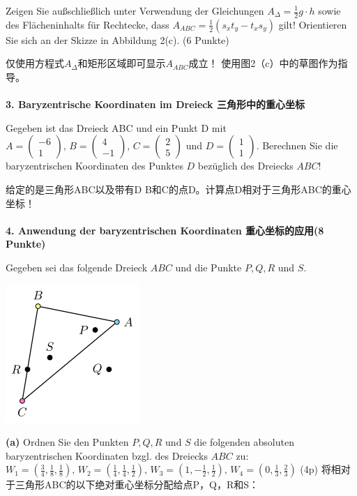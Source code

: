 \documentclass[fleqn]{article}
\begin{document}
Zeigen Sie außschließlich unter Verwendung der Gleichungen $A_\Delta=\frac{1}{2}g\cdot h$ sowie des Flächeninhalts für Rechtecke, dass $A_{ABC}=\frac{1}{2}(s_xt_y-t_xs_y)$ gilt!
Orientieren Sie sich an der Skizze in Abbildung 2(c). (6 Punkte)

仅使用方程式$A_\Delta$和矩形区域即可显示$A_{ABC}$成立！ 使用图2（c）中的草图作为指导。
\\
\\
\noindent\textbf{3. Baryzentrische Koordinaten im Dreieck 三角形中的重心坐标}

Gegeben ist das Dreieck ABC und ein Punkt D mit $A=\begin{pmatrix}
    -6\\1
\end{pmatrix},\,B=\begin{pmatrix}
    4\\-1
\end{pmatrix},\,C=\begin{pmatrix}
    2\\5
\end{pmatrix}$ und $D=\begin{pmatrix}
    1\\1
\end{pmatrix}$. Berechnen Sie die baryzentrischen Koordinaten des Punktes $D$ bezüglich des Dreiecks $ABC$!

给定的是三角形ABC以及带有D B和C的点D。计算点D相对于三角形ABC的重心坐标！
\\
\\
\noindent\textbf{4. Anwendung der baryzentrischen Koordinaten 重心坐标的应用(8 Punkte)}

Gegeben sei das folgende Dreieck $ABC$ und die Punkte $P, Q, R$ und $S$.

\includegraphics[scale=0.6]{17.png}

\indent\textbf{(a)} Ordnen Sie den Punkten $P, Q, R$ und $S$ die folgenden absoluten baryzentrischen Koordinaten bzgl. des Dreiecks $ABC$ zu:
$W_1=(\frac{3}{4},\frac{1}{8},\frac{1}{8}),\,W_2=(\frac{1}{4},\frac{1}{4},\frac{1}{2}),\,W_3=(1,-\frac{1}{2},\frac{1}{2}),\,W_4=(0,\frac{1}{3},\frac{2}{3})$ (4p)
将相对于三角形ABC的以下绝对重心坐标分配给点P，Q，R和S：
\end{document}
